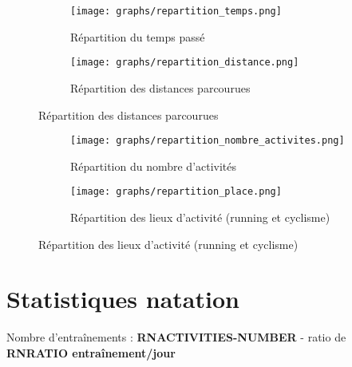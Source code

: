 \documentclass[a4paper,french,11pt]{report}
\begin{document}
\begin{figure}[!ht]
\begin{subfigure}{.49\linewidth}

\centering

\texttt{[image: graphs/repartition\_temps.png]}
\caption*{Répartition du temps passé}

\end{subfigure}\hfill
\begin{subfigure}{.49\linewidth}

\centering

\texttt{[image: graphs/repartition\_distance.png]}
\caption*{Répartition des distances parcourues}

\end{subfigure}

\end{figure}


\begin{figure}[!ht]
\begin{subfigure}{.49\linewidth}

\centering

\texttt{[image: graphs/repartition\_nombre\_activites.png]}
\caption*{Répartition du nombre d'activités}

\end{subfigure}\hfill
\begin{subfigure}{.49\linewidth}

\centering

\texttt{[image: graphs/repartition\_place.png]}
\caption*{Répartition des lieux d'activité (running et cyclisme)}

\end{subfigure}

\end{figure}

\newpage


\section*{Statistiques natation}
\thispagestyle{empty}


\textbullet Nombre d'entraînements : \textbf{RNACTIVITIES-NUMBER} -
ratio de \textbf{RNRATIO entraînement/jour}
\end{document}
